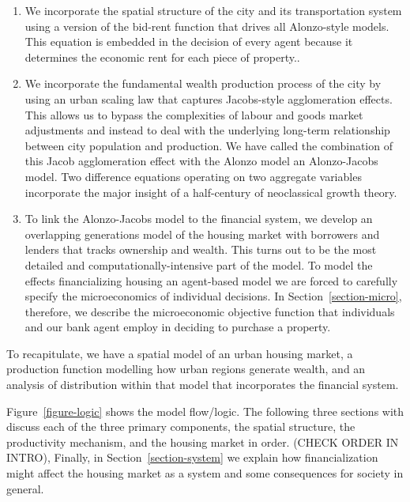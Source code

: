 \begin{enumerate}
\item We incorporate the spatial structure of the city and its transportation system using a version of the \gls{bid-rent function} that drives all Alonzo-style models. This equation is embedded in the decision of every agent because it determines the economic rent  for each piece of property..

\item We incorporate the fundamental wealth production process of the city by using an \gls{urban scaling} law that captures Jacobs-style agglomeration effects. This allows us to bypass the complexities of labour and goods market adjustments and  instead to deal with the underlying long-term relationship between city  population and production. We have called the combination of this Jacob agglomeration effect with the Alonzo model an \gls{Alonzo-Jacobs model}.  Two difference equations operating on two aggregate variables incorporate the major insight of a half-century of \gls{neoclassical growth theory}.

\item To link the Alonzo-Jacobs model to the financial system, we develop an \gls{overlapping generations} model of the housing market with borrowers and lenders that tracks ownership and wealth. This turns out to be the most detailed and computationally-intensive part of the model. To model the effects financializing housing an \gls{agent-based model} we are forced to carefully specify the microeconomics of  individual decisions. In Section~\ref{section-micro}, therefore, we describe the microeconomic objective function that individuals and our bank agent employ in deciding to purchase a property. 
\end{enumerate}

To recapitulate, we have a spatial model of an urban housing market, a production function modelling how urban regions generate wealth, and an analysis of distribution within that model that incorporates the financial system.

Figure~\ref{figure-logic} shows the model flow/logic. 
The following three sections with discuss each of the three primary components, the spatial structure, the productivity mechanism, and the housing market in order. (CHECK ORDER IN INTRO), Finally, in  Section~\ref{section-system} we explain how financialization might affect the housing market as a system and some consequences for society in general. %

